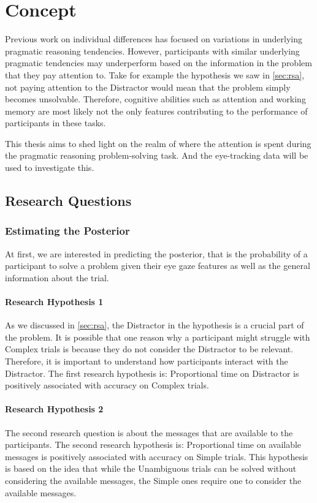 ﻿\chapter{Concept}
 
Previous work on individual differences \citep{Franke_2016} has focused on variations in underlying pragmatic reasoning tendencies. However, participants with similar underlying pragmatic tendencies may underperform based on the information in the problem that they pay attention to. Take for example the hypothesis we saw in \autoref{sec:rsa}, not paying attention to the Distractor would mean that the problem simply becomes unsolvable. Therefore, cognitive abilities such as attention and working memory are most likely not the only features contributing to the performance of participants in these tasks.

This thesis aims to shed light on the realm of where the attention is spent during the pragmatic reasoning problem-solving task. And the eye-tracking data will be used to investigate this. 

\section{Research Questions}
\label{sec:research_questions}

\subsection{Estimating the Posterior}
\label{sec:posterior}
At first, we are interested in predicting the posterior, that is the probability of a participant to solve a problem given their eye gaze features as well as the general information about the trial.

\subsubsection{Research Hypothesis 1}
\label{sec:h1}
As we discussed in \autoref{sec:rsa}, the Distractor in the hypothesis is a crucial part of the problem. It is possible that one reason why a participant might struggle with Complex trials is because they do not consider the Distractor to be relevant. Therefore, it is important to understand how participants interact with the Distractor. The first research hypothesis is: Proportional time on Distractor is positively associated with accuracy on Complex trials.

\subsubsection{Research Hypothesis 2}
\label{sec:h2}
The second research question is about the messages that are available to the participants. The second research hypothesis is: Proportional time on available messages is positively associated with accuracy on Simple trials. This hypothesis is based on the idea that while the Unambiguous trials can be solved without considering the available messages, the Simple ones require one to consider the available messages.

